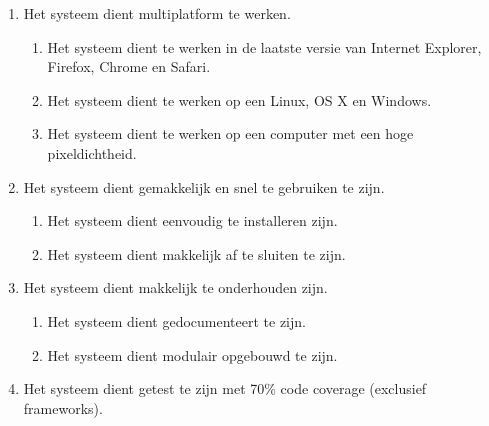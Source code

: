 \begin{enumerate}[label={R\arabic*}]
\setcounter{enumi}{\value{startvalue}}
	\item \label{req:multiplatform} Het systeem dient multiplatform te werken.
	\begin{enumerate}[label={R\arabic{enumi}.\arabic*}]
		\item Het systeem dient te werken in de laatste versie van Internet Explorer, Firefox, Chrome en Safari.
		\item Het systeem dient te werken op een Linux, OS X en Windows.
		\item Het systeem dient te werken op een computer met een hoge pixeldichtheid.
	\end{enumerate}
	\item \label{req:performance} Het systeem dient gemakkelijk en snel te gebruiken te zijn.
	\begin{enumerate}[label={R\arabic{enumi}.\arabic*}]
		\item Het systeem dient eenvoudig te installeren zijn.
		\item Het systeem dient makkelijk af te sluiten te zijn.
	\end{enumerate}
	\item \label{req:maintenance} Het systeem dient makkelijk te onderhouden zijn.
	\begin{enumerate}[label={R\arabic{enumi}.\arabic*}]
		\item Het systeem dient gedocumenteert te zijn.
		\item Het systeem dient modulair opgebouwd te zijn.
	\end{enumerate}
	\item \label{req:coverage} Het systeem dient getest te zijn met 70\% code coverage (exclusief frameworks).
\end{enumerate}